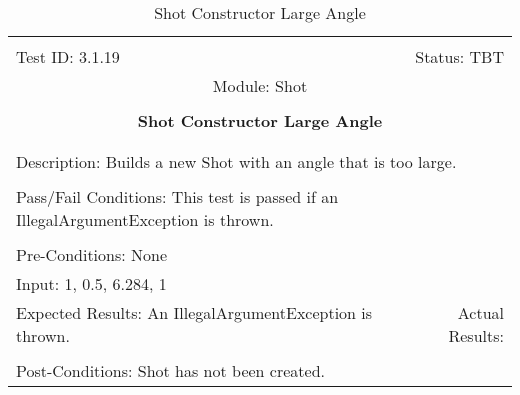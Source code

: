 \documentclass[titlepage]{article}
\begin{document}
\begin{center}%
\begin{table}[h!]
\begin{tabular}{|l r|}\hline&\\[-2mm]
	Test ID: 3.1.19	&Status: TBT\\[-3mm]
	\multicolumn{2}{|c|}{Module: Shot}\\&\\
	\multicolumn{2}{|c|}{\textbf{\large{Shot Constructor Large Angle}}}\\&\\\hline&\\[-3mm]
	\multicolumn{2}{|p{\textwidth}|}{Description: Builds a new Shot with an angle that is too large.}\\[1mm]\hline&\\[-3mm]
	\multicolumn{2}{|p{\textwidth}|}{Pass/Fail Conditions: This test is passed if an IllegalArgumentException is thrown.}\\[1mm]\hline&\\[-3mm]
	\multicolumn{2}{|p{\textwidth}|}{Pre-Conditions: None}\\[4mm]
	\multicolumn{2}{|p{\textwidth}|}{Input: 1, 0.5, 6.284, 1}\\[2mm]\hline
	\multicolumn{1}{|p{0.49\textwidth}}{Expected Results: An IllegalArgumentException is thrown.}	&\multicolumn{1}{|p{0.45\textwidth}|}{Actual Results: }\\\hline&\\[-3mm]
	\multicolumn{2}{|p{\textwidth}|}{Post-Conditions: Shot has not been created.}\\\hline
\end{tabular}
\caption{Shot Constructor Large Angle}
\end{table}
\end{center}
\newpage
\end{document}
